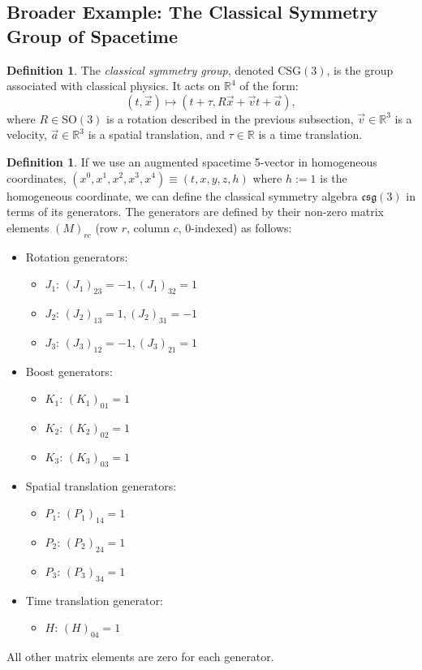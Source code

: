 \documentclass{amsart}
\theoremstyle{definition}
\newtheorem{definition}[theorem]{Definition}
\theoremstyle{remark}
\begin{document}
\subsection{Broader Example: The Classical Symmetry Group of Spacetime}
\label{subsec:csg}
\begin{definition}
  The \emph{classical symmetry group}, denoted $\mathrm{CSG}(3)$, is the group associated with classical physics.
  It acts on $\mathbb{R}^4$ of the form:
  \begin{equation*}
    (t, \vec{x}) \mapsto (t + \tau, R \vec{x} + \vec{v} t + \vec{a}),
  \end{equation*}
  where $R \in \mathrm{SO}(3)$ is a rotation described in the previous subsection, $\vec{v} \in \mathbb{R}^3$ is a velocity, $\vec{a} \in \mathbb{R}^3$ is a spatial translation, and $\tau \in \mathbb{R}$ is a time translation.
\end{definition}
\begin{definition}
  If we use an augmented spacetime 5-vector in homogeneous coordinates, $(x^0, x^1, x^2, x^3, x^4) \equiv (t,x,y,z,h)$ where $h:=1$ is the homogeneous coordinate, we can define the classical symmetry algebra $\mathfrak{csg}(3)$ in terms of its generators.
  The generators are defined by their non-zero matrix elements $(M)_{rc}$ (row $r$, column $c$, 0-indexed) as follows:
    \begin{itemize}
        \item Rotation generators:
        \begin{itemize}
            \item $J_1$: $(J_1)_{23} = -1, (J_1)_{32} = 1$
            \item $J_2$: $(J_2)_{13} = 1, (J_2)_{31} = -1$
            \item $J_3$: $(J_3)_{12} = -1, (J_3)_{21} = 1$
        \end{itemize}
        \item Boost generators:
        \begin{itemize}
            \item $K_1$: $(K_1)_{01} = 1$
            \item $K_2$: $(K_2)_{02} = 1$
            \item $K_3$: $(K_3)_{03} = 1$
        \end{itemize}
        \item Spatial translation generators:
        \begin{itemize}
            \item $P_1$: $(P_1)_{14} = 1$
            \item $P_2$: $(P_2)_{24} = 1$
            \item $P_3$: $(P_3)_{34} = 1$
        \end{itemize}
        \item Time translation generator:
        \begin{itemize}
            \item $H$: $(H)_{04} = 1$
        \end{itemize}
    \end{itemize}
    All other matrix elements are zero for each generator.
\end{definition}
\end{document}
